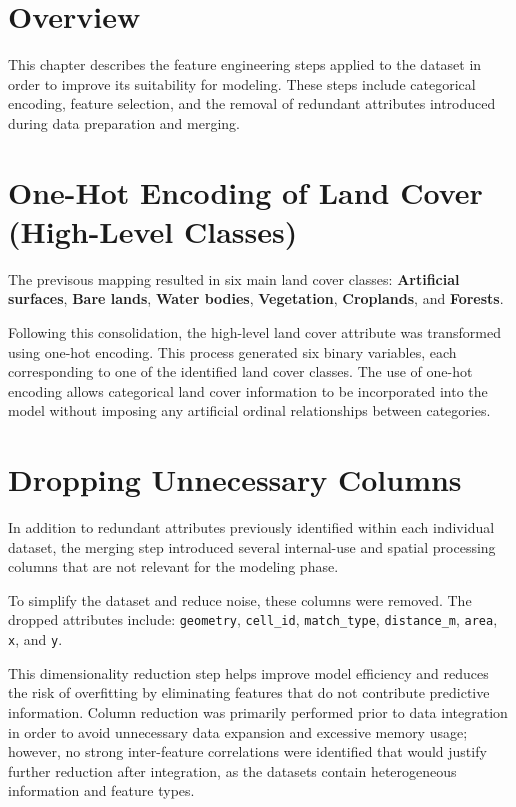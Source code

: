 \section{Overview}
This chapter describes the feature engineering steps applied to the dataset in order to improve its suitability for modeling. These steps include categorical encoding, feature selection, and the removal of redundant attributes introduced during data preparation and merging.

\section{One-Hot Encoding of Land Cover (High-Level Classes)}

The previsous mapping resulted in six main land cover classes: \textbf{Artificial surfaces}, \textbf{Bare lands}, \textbf{Water bodies}, \textbf{Vegetation}, \textbf{Croplands}, and \textbf{Forests}.

Following this consolidation, the high-level land cover attribute was transformed using one-hot encoding. This process generated six binary variables, each corresponding to one of the identified land cover classes. The use of one-hot encoding allows categorical land cover information to be incorporated into the model without imposing any artificial ordinal relationships between categories.


\section{Dropping Unnecessary Columns}
In addition to redundant attributes previously identified within each individual dataset, the merging step introduced several internal-use and spatial processing columns that are not relevant for the modeling phase.

To simplify the dataset and reduce noise, these columns were removed. The dropped attributes include:
\texttt{geometry}, \texttt{cell\_id}, \texttt{match\_type}, \texttt{distance\_m}, \texttt{area}, \texttt{x}, and \texttt{y}.

This dimensionality reduction step helps improve model efficiency and reduces the risk of overfitting by eliminating features that do not contribute predictive information.
Column reduction was primarily performed prior to data integration in order to avoid unnecessary data expansion and excessive memory usage; however, no strong inter-feature correlations were identified that would justify further reduction after integration, as the datasets contain heterogeneous information and feature types.